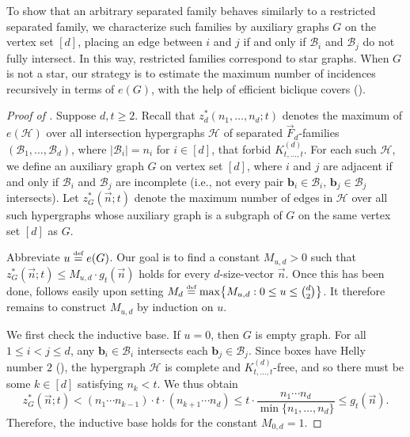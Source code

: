 \documentclass[11pt]{article}
\theoremstyle{definition}
\newcommand*{\eqdef}{\stackrel{\mbox{\normalfont\tiny def}}{=}} %
\newcommand*{\cH}{\mathcal{H}}
\newcommand*{\vF}{\vec{F}}
\newcommand*{\cB}{\mathcal{B}}
\newcommand*{\vn}{\vec{n}}
\begin{document}
\medskip
To show that an arbitrary separated family behaves similarly to a restricted separated family, we characterize such families by auxiliary graphs $G$ on the vertex set $[d]$, placing an edge between $i$ and $j$ if and only if $\cB_i$ and $\cB_j$ do not fully intersect. In this way, restricted families correspond to star graphs. When $G$ is not a star, our strategy is to estimate the maximum number of incidences recursively in terms of $e(G)$, with the help of efficient biclique covers (). 

\begin{proof}[Proof of ]
    Suppose $d, t \ge 2$. Recall that $z_d^*(n_1, \dots, n_d; t)$ denotes the maximum of $e(\cH)$ over all intersection hypergraphs $\cH$ of separated $\vF_d$-families $(\cB_1, \dots, \cB_d)$, where $|\cB_i| = n_i$ for $i \in [d]$, that forbid $K_{t, \dots, t}^{(d)}$. For each such $\cH$, we define an auxiliary graph $G$ on vertex set $[d]$, where $i$ and $j$ are adjacent if and only if $\cB_i$ and $\cB_j$ are incomplete (i.e., not every pair $\bm{b}_i \in \cB_i, \, \bm{b}_j \in \cB_j$ intersects). Let $z_G^*(\vn; t)$ denote the maximum number of edges in $\cH$ over all such hypergraphs whose auxiliary graph is a subgraph of $G$ on the same vertex set $[d]$ as $G$. 
    
    Abbreviate $u \eqdef e(G)$. Our goal is to find a constant $M_{u, d} > 0$ such that $z^*_G(\vn; t) \le M_{u, d} \cdot g_t(\vn)$ holds for every $d$-size-vector $\vn$. Once this has been done,  follows easily upon setting $M_d \eqdef \max \bigl\{ M_{u, d} : 0 \le u \le \binom{d}{2} \bigr\}$. It therefore remains to construct $M_{u, d}$ by induction on $u$. 
    
    We first check the inductive base. If $u = 0$, then $G$ is empty graph. For all $1 \le i < j \le d$, any $\bm{b}_i \in \cB_i$ intersects each $\bm{b}_j \in \cB_j$. Since boxes have Helly number $2$ (), the hypergraph $\cH$ is complete and $K_{t, \dots, t}^{(d)}$-free, and so there must be some $k \in [d]$ satisfying $n_k < t$. We thus obtain
    \[
    z^*_G(\vn; t) < (n_1 \cdots n_{k-1}) \cdot t \cdot (n_{k+1} \cdots n_d) \le t \cdot \frac{n_1 \cdots n_d}{\min\{n_1, \dots, n_d\}} \le g_t(\vn). 
    \]
    Therefore, the inductive base holds for the constant $M_{0, d} = 1$. 


\end{proof}
\end{document}
